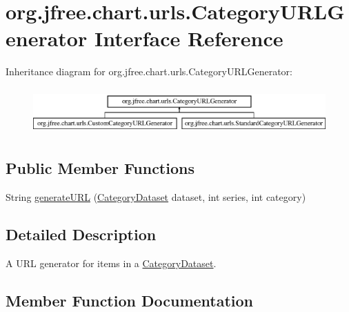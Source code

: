 \hypertarget{interfaceorg_1_1jfree_1_1chart_1_1urls_1_1_category_u_r_l_generator}{}\section{org.\+jfree.\+chart.\+urls.\+Category\+U\+R\+L\+Generator Interface Reference}
\label{interfaceorg_1_1jfree_1_1chart_1_1urls_1_1_category_u_r_l_generator}
Inheritance diagram for org.\+jfree.\+chart.\+urls.\+Category\+U\+R\+L\+Generator\+:\begin{figure}[H]
\begin{center}
\leavevmode
\includegraphics[height=1.783440cm]{interfaceorg_1_1jfree_1_1chart_1_1urls_1_1_category_u_r_l_generator}
\end{center}
\end{figure}
\subsection*{Public Member Functions}
\begin{DoxyCompactItemize}
\item 
String \mbox{\hyperlink{interfaceorg_1_1jfree_1_1chart_1_1urls_1_1_category_u_r_l_generator_a79085c43a3cdca05ab0bc3cfd8901727}{generate\+U\+RL}} (\mbox{\hyperlink{interfaceorg_1_1jfree_1_1data_1_1category_1_1_category_dataset}{Category\+Dataset}} dataset, int series, int category)
\end{DoxyCompactItemize}


\subsection{Detailed Description}
A U\+RL generator for items in a \mbox{\hyperlink{}{Category\+Dataset}}. 

\subsection{Member Function Documentation}
\mbox{\label{interfaceorg_1_1jfree_1_1chart_1_1urls_1_1_category_u_r_l_generator_a79085c43a3cdca05ab0bc3cfd8901727}} 
